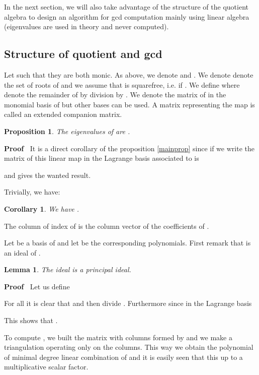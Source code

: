 \documentclass{article}
\newenvironment{proof}{\noindent\textbf{Proof\ }}{\hspace*{\fill}\medskip}
\newtheorem{corollary}{Corollary}
\newtheorem{lemma}{Lemma}
{\theorembodyfont{\rmfamily\small}\newtheorem{problem}{Problem}}
\newtheorem{proposition}{Proposition}
\begin{document}
In the next section, we will also take advantage of the structure of the
quotient algebra to design an algorithm for gcd computation mainly using
linear algebra (eigenvalues are used in theory and never computed).

\subsection{Structure of quotient and gcd}



Let  such that they are both monic.
As above, we denote  and . We
denote denote  the set of roots of  and
we assume that  is squarefree, i.e.  if . We define  where  denote the remainder of
 by division by . We denote  the matrix
of  in the monomial basis  of
 but other bases can be used. A matrix representing the map
 is called an extended companion matrix.

\begin{proposition}
  The eigenvalues of  are .
\end{proposition}

\begin{proof}
  It is a direct corollary of the proposition \ref{mainprop} since if we write
  the matrix of this linear map in the Lagrange basis associated to
   is
  
  and gives the wanted result.
\end{proof}

Trivially, we have:

\begin{corollary}
  We have .
\end{corollary}

The column of index  of  is the column vector of the coefficients of
.



Let  be a basis of  and let  be the corresponding polynomials. First remark that
 is an ideal of .

\begin{lemma}
  The ideal  is a principal ideal. 
\end{lemma}

\begin{proof}
  Let us define
  
  For all  it is clear that
   and then  divide . Furthermore  since in the Lagrange basis
  
  This shows that .
\end{proof}

To compute , we built the matrix with columns formed by  and we make a triangulation operating only on the columns. This way we
obtain the polynomial of minimal degree linear combination of  and it is easily seen that this  up to a
multiplicative scalar factor.
\end{document}
